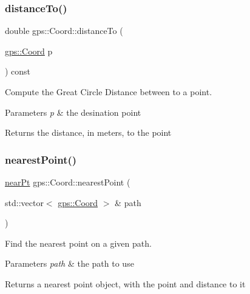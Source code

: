 \subsubsection{\texorpdfstring{distance\+To()}{distanceTo()}}
{\footnotesize\ttfamily double gps\+::\+Coord\+::distance\+To (\begin{DoxyParamCaption}\item[{\hyperlink{classgps_1_1Coord}{gps\+::\+Coord}}]{p }\end{DoxyParamCaption}) const}

Compute the Great Circle Distance between to a point. 
\begin{DoxyParams}{Parameters}
{\em p} & the desination point \\
\hline
\end{DoxyParams}
\begin{DoxyReturn}{Returns}
the distance, in meters, to the point 
\end{DoxyReturn}
\mbox{\label{classgps_1_1Coord_a4b7faf8c9e2b4196bcbb450b5448c36f}} 
\subsubsection{\texorpdfstring{nearest\+Point()}{nearestPoint()}}
{\footnotesize\ttfamily \hyperlink{structgps_1_1nearPt}{near\+Pt} gps\+::\+Coord\+::nearest\+Point (\begin{DoxyParamCaption}\item[{std\+::vector$<$ \hyperlink{classgps_1_1Coord}{gps\+::\+Coord} $>$ \&}]{path }\end{DoxyParamCaption})}

Find the nearest point on a given path.


\begin{DoxyParams}{Parameters}
{\em path} & the path to use \\
\hline
\end{DoxyParams}
\begin{DoxyReturn}{Returns}
a nearest point object, with the point and distance to it 
\end{DoxyReturn}
\mbox{\label{classgps_1_1Coord_ad832b140a8a39355874e268834d078cd}} 
